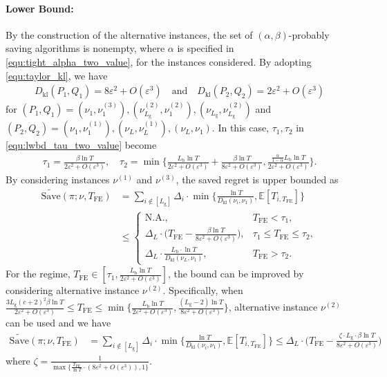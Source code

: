 \documentclass[twoside,11pt]{article}
\newcommand{\kl}{D_{\mathrm{kl}}}
\newcommand{\rmb}{\mathrm{b}}
\newcommand{\rmg}{\mathrm{g}}
\newcommand{\bbE}{\mathbb{E}}
\newcommand{\Tfe}{T_{\mathrm{FE}}}
\newcommand{\Saved}{\mathrm{Save}}
\begin{document}
\paragraph{Lower Bound:}
By the construction of the alternative instances, the set of $(\alpha,\beta)$-probably saving algorithms is nonempty, where $\alpha$ is specified in \eqref{equ:tight_alpha_two_value}, for the instances considered.
By adopting \eqref{equ:taylor_kl}, we have
\begin{align}
    \kl(P_1,Q_1) = 8\varepsilon^2+O(\varepsilon^3)
    \quad\mbox{and}\quad
    \kl(P_2,Q_2) = 2\varepsilon^2+O(\varepsilon^3)
\end{align}
for $(P_1,Q_1)= (\nu_1,\nu_1^{(3)}),(\nu_{L_{\rmg}}^{(2)},\nu_1^{(2)}),(\nu_{L_{\rmg}},\nu_{L_{\rmg}}^{(2)})$ and $(P_2,Q_2)=(\nu_1,\nu_1^{(1)}),(\nu_L,\nu_L^{(1)}),(\nu_L,\nu_1).$
In this case, $\tau_1,\tau_2$ in \eqref{equ:lwbd_tau_two_value} become
\begin{align}
    \tau_1 = \frac{\beta\ln T}{2\varepsilon^2+O(\varepsilon^3)}
    ,\quad
    \tau_2 = \min\bigg\{\frac{L_{\rmb}\ln T}{2\varepsilon^2+O(\varepsilon^3)}+\frac{\beta\ln T}{8\varepsilon^2+O(\varepsilon^3)}, \frac{\frac{\alpha}{1-\alpha}L_{\rmb}\ln T}{2\varepsilon^2+O(\varepsilon^3)}\bigg\}.
\end{align}
By considering instances $\nu^{(1)}$ and $\nu^{(3)}$,
the saved regret is upper bounded as
\begin{align}
    \widetilde{\Saved}(\pi;\nu,\Tfe)&=\sum_{i\notin [L_{\rmg}]}
    \Delta_i\cdot \min\bigg\{\frac{\ln T}{\kl(\nu_i,\nu_1)},\bbE[T_{i,\Tfe}]\bigg\}
    \\
    &
    \leq
    \begin{cases}
        \mbox{N.A.},& \Tfe < \tau_1,
        \\
        \Delta_L\cdot \Big(\Tfe-\frac{\beta\ln T}{8\varepsilon^2+O(\varepsilon^3)}\Big),& \tau_1\leq \Tfe\leq \tau_2,
        \\
        \Delta_L\cdot \frac{L_{\rmb}\cdot\ln T}{\kl(\nu_L,\nu_1)},& \Tfe> \tau_2.
    \end{cases}
\end{align}
For the regime, $\Tfe\in[\tau_1,\frac{L_{\rmb}\ln T}{2\varepsilon^2+O(\varepsilon^3)}]$, the bound can be improved by considering alternative instance $\nu^{(2)}$. Specifically, 
when 
$\frac{3L_{\rmg}(c+2)^2\beta \ln T}{2\varepsilon^2+O(\varepsilon^3)}\leq \Tfe \leq \min\{\frac{L_{\rmb}\ln T}{2\varepsilon^2+O(\varepsilon^3)},\frac{(L_{\rmg}-2)\ln T}{8\varepsilon^2+O(\varepsilon^3)}\} $, 
alternative instance $\nu^{(2)}$ can be used and
we have
\begin{align}
    \widetilde{\Saved}(\pi;\nu,\Tfe)&=\sum_{i\notin [L_{\rmg}]}
    \Delta_i\cdot \min\bigg\{\frac{\ln T}{\kl(\nu_i,\nu_1)},\bbE[T_{i,\Tfe}]\bigg\}
    \leq
    \Delta_L \cdot \bigg(
            \Tfe - 
            \frac{\zeta\cdot L_{\rmg}\cdot \beta\ln T}{8\varepsilon^2+O(\varepsilon^3)}
        \bigg)
\end{align}
where $\zeta=\frac{1}{\max\big\{\frac{\Tfe}{\ln T}\cdot (8\varepsilon^2+O(\varepsilon^3)),1\big\}}$.
\end{document}
